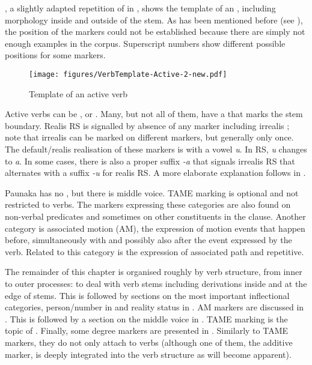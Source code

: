 , a slightly adapted repetition of  in , shows the template of an , including morphology inside and outside of the stem. As has been mentioned before (see ), the position of the  markers could not be established because there are simply not enough examples in the corpus. Superscript numbers show different possible positions for some markers.

\begin{sidewaysfigure}

\texttt{[image: figures/VerbTemplate-Active-2-new.pdf]}
\caption{Template of an active verb}
\label{fig:VerbTemplate-Active}
\end{sidewaysfigure}

Active verbs can be ,  or . Many, but not all of them, have a  that marks the stem boundary. Realis RS is signalled by absence of any marker including irrealis ; note that irrealis can be marked on different markers, but generally only once. The default/realis realisation of these markers is with a vowel \textit{u}. In  RS, \textit{u} changes to \textit{a}. In some cases, there is also a proper suffix \textit{-a} that signals irrealis RS that alternates with a suffix \textit{-u} for realis RS. A more elaborate explanation follows in .

Paunaka has no , but there is middle voice. TAME marking is optional and not restricted to verbs. The markers expressing these categories are also found on non-verbal predicates and sometimes on other constituents in the clause. Another category is associated motion (AM), the expression of motion events that happen before, simultaneously with and possibly also after the event expressed by the verb. Related to this category is the expression of associated path and repetitive.

The remainder of this chapter is organised roughly by verb structure, from inner to outer processes:  to  deal with verb stems including derivations inside and at the edge of stems. This is followed by sections on the most important inflectional categories, person/number in  and reality status in . AM markers are discussed in . This is followed by a section on the middle voice in . TAME marking is the topic of . Finally, some degree markers are presented in . Similarly to TAME markers, they do not only attach to verbs (although one of them, the additive marker, is deeply integrated into the verb structure as will become apparent).


